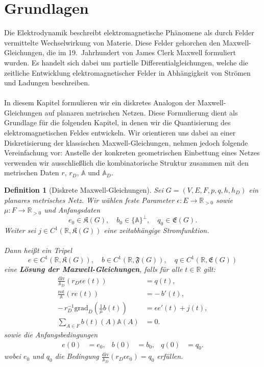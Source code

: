 \documentclass[11pt,a4paper,leqno]{report}
\newtheorem{definition}[theorem]{Definition}
\numberwithin{equation}{chapter}
\begin{document}
\section{Grundlagen}
Die Elektrodynamik beschreibt elektromagnetische Phänomene als durch Felder vermittelte Wechselwirkung von Materie. 
Diese Felder gehorchen den Maxwell-Gleichungen, die im 19.~Jahrhundert von James Clerk Maxwell formuliert wurden. 
Es handelt sich dabei um partielle Differentialgleichungen, welche die zeitliche Entwicklung elektromagnetischer Felder in Abhängigkeit von Strömen und Ladungen beschreiben. \\
\\
In diesem Kapitel formulieren wir ein diskretes Analogon der Maxwell-Gleichungen auf planaren metrischen Netzen. Diese Formulierung dient als Grundlage für die folgenden Kapitel, in denen wir die Quantisierung des elektromagnetischen Feldes entwickeln.  
Wir orientieren uns dabei an einer Diskretisierung der klassischen Maxwell-Gleichungen, 
nehmen jedoch folgende Vereinfachung vor: Anstelle der konkreten geometrischen Einbettung 
eines Netzes verwenden wir ausschließlich die kombinatorische Struktur zusammen mit den 
metrischen Daten \(r\), \(r_D\), \(\mathbb{A}\) und \(\mathbb{A}_D\).
\begin{definition}[Diskrete Maxwell-Gleichungen]\label{def:diskrete_maxwell}
	Sei $G=(V,E,F,p,q,h,h_D)$ ein planares metrisches Netz.  
	Wir wählen feste Parameter $ \epsilon: E \to \mathbb{R}_{>0}$ sowie $ \mu: F \to \mathbb{R}_{>0}$ und Anfangsdaten
	\[
	e_0 \in \mathfrak{K}(G), 
	\quad b_0 \in \{\mathbb{A}\}^\perp, 
	\quad q_0 \in \mathfrak{E}(G).
	\]
	Weiter sei $j \in C^1(\mathbb{R}, \mathfrak{K}(G))$ eine zeitabhängige Stromfunktion.\\  
	\\
	Dann heißt ein Tripel
	\[
	e \in C^1(\mathbb{R},\mathfrak{K}(G)), 
	\quad b \in C^1(\mathbb{R},\mathfrak{F}(G)), 
	\quad q \in C^1(\mathbb{R},\mathfrak{E}(G))
	\]
	eine \textbf{Lösung der Maxwell-Gleichungen}, falls für alle $t\in\mathbb{R}$ gilt:
	\begin{align}
		\frac{\mathrm{div}}{\mathbb{A}_D}(r_D\epsilon e(t)) &= q(t), \label{eq:disk-gauss}\\
		\frac{\mathrm{rot}}{\mathbb{A}}(r e(t)) &= -\, b'(t), \label{eq:disk-faraday}\\
		-\,r_D^{-1}\mathrm{grad}_D\!\left(\tfrac{1}{\mu} b(t)\right) &= \epsilon e'(t) + j(t), \label{eq:disk-ampere} \\
		\sum_{A\in F} b(t)(A)\mathbb{A}(A) &= 0. \label{eq:disk-magnetgauss}
	\end{align}
	sowie die Anfangsbedingungen
	\begin{align}
		e(0) &= e_0, &
		b(0) &= b_0, &
		q(0) &= q_0.
	\end{align}
	wobei \(e_0\) und \(q_0\) die Bedingung \(\frac{\mathrm{div}}{\mathbb{A}_D}(r_D\epsilon e_0) = q_0\) erfüllen.
\end{definition}
\end{document}
